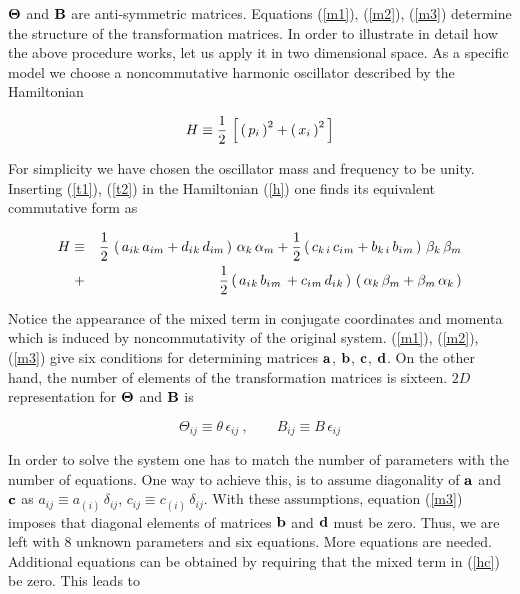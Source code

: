 \documentclass[a4paper,aps,prd,preprint]{revtex4}
\begin{document}
${\bf \Theta}$ and ${\bf B}$ are anti-symmetric matrices. 
Equations (\ref{m1}), (\ref{m2}), (\ref{m3}) determine the 
 structure of the transformation  matrices. In order to illustrate in detail
 how the above procedure works, let us apply it in two dimensional space.
 As a specific model we choose a noncommutative  harmonic oscillator described 
 by the Hamiltonian
  
  \begin{equation}
H\equiv {1\over 2}\,\left[\, \left(\, p_i\,\right)^2 + \left(\, x_i\,\right)^2\,
 \right]\label{h}
\end{equation}

For simplicity we have chosen the  oscillator mass and frequency to be unity.\\
 
 Inserting (\ref{t1}), (\ref{t2}) in the 
Hamiltonian (\ref{h}) one finds its equivalent commutative form as

\begin{eqnarray}
H\equiv && {1\over 2}\, \left(\, a_{ik}\, a_{im}+d_i{}_k \, d_{im}
  \,\right)\,\alpha_k\, \alpha_m + {1\over 2}\left(\, c_{k\,i}\, c_i{}_m
  +b_{k\,i}\, b_i{}_m\,\right)\,\beta_k\,\beta_m \nonumber\\
  +&& {1\over 2} \left(\, a_i{}_k\,b_i{}_m\, +c_i{}_m \,  
  d_i{}_k \,\right)\,\left(\, \alpha_k\,\beta_m +\beta_m\, \alpha_k\,\right)
\label{hc}
\end{eqnarray}

Notice the appearance of the mixed term in conjugate coordinates and momenta
 which
is induced by  noncommutativity of the original system. 
   (\ref{m1}), (\ref{m2}), (\ref{m3}) give six conditions for determining
   matrices     ${\bf a}$,  ${\bf b}$,  ${\bf c}$, ${\bf d}$.
 On the other hand, the number of elements of the transformation matrices is 
 sixteen. $2D$ representation for ${\bf \Theta}$ and ${\bf B}$ is
  
   \begin{equation}
   \Theta_{ij}\equiv \theta\, \epsilon_{ij}\ ,\qquad
    B_{ij}\equiv B\, \epsilon_{ij}
   \end{equation}
   
   In order to solve the system one has to 
   match the number of parameters with the number of equations. One way
   to achieve this, is to assume diagonality of ${\bf a}$ and ${\bf c}$ as
   $a_{ij} \equiv a_{(i)}\,\delta_{ij}$,  
   $c_{ij}\equiv c_{(i)}\,\delta_{ij}$. With these assumptions,
    equation (\ref{m3}) imposes that diagonal elements of  matrices 
    ${\bf b}$ and  ${\bf d}$ must be zero.  Thus,  we are left with
   $8$ unknown parameters and six equations.  More equations are 
   needed. Additional equations can be obtained by requiring that the mixed 
   term in (\ref{hc}) be zero. This leads to
   
\end{document}
